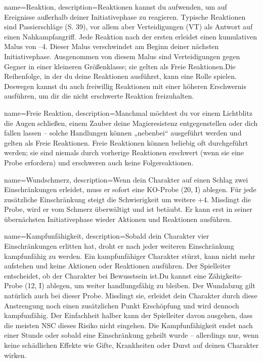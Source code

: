 {
    name={Reaktion},
    description={Reaktionen kannst du aufwenden, um auf Ereignisse außerhalb deiner Initiativephase zu reagieren. Typische Reaktionen sind Passierschläge (S. 39), vor allem aber Verteidigungen (VT) als Antwort auf einen Nahkampfangriff. Jede Reaktion nach der ersten erleidet einen kumulativen Malus von –4. Dieser Malus verschwindet am Beginn deiner nächsten Initiativephase. Ausgenommen von diesem Malus sind Verteidigungen gegen Gegner in einer kleineren Größenklasse; sie gelten als Freie Reaktionen.\newline     Die Reihenfolge, in der du deine Reaktionen ausführst, kann eine Rolle spielen. Deswegen kannst du auch freiwillig Reaktionen mit einer höheren Erschwernis ausführen, um dir die nicht erschwerte Reaktion freizuhalten.}
}


{
    name={Freie Reaktion},
    description={Manchmal möchtest du vor einem Lichtblitz die Augen schließen, einem Zauber deine Magieresistenz entgegenstellen oder dich fallen lassen – solche Handlungen können „nebenbei“ ausgeführt werden und gelten als Freie Reaktionen. Freie Reaktionen können beliebig oft durchgeführt werden; sie sind niemals durch vorherige Reaktionen erschwert (wenn sie eine Probe erfordern) und erschweren auch keine Folgereaktionen.}
}


{
    name={Wundschmerz},
    description={Wenn dein Charakter auf einen Schlag zwei Einschränkungen erleidet, muss er sofort eine KO-Probe (20, I) ablegen. Für jede zusätzliche Einschränkung steigt die Schwierigkeit um weitere +4. Misslingt die Probe, wird er vom Schmerz überwältigt und ist betäubt. Er kann erst in seiner übernächsten Initiativephase wieder Aktionen und Reaktionen ausführen.}
}


{
    name={Kampfunfähigkeit},
    description={Sobald dein Charakter vier Einschränkungen erlitten hat, droht er nach jeder weiteren Einschränkung kampfunfähig zu werden. Ein kampfunfähiger Charakter stürzt, kann nicht mehr aufstehen und keine Aktionen oder Reaktionen ausführen. Der Spielleiter entscheidet, ob der Charakter bei Bewusstsein ist.\newline     Du kannst eine Zähigkeits-Probe (12, I) ablegen, um weiter handlungsfähig zu bleiben. Der Wundabzug gilt natürlich auch bei dieser Probe. Misslingt sie, erleidet dein Charakter durch diese Anstrengung noch einen zusätzlichen Punkt Erschöpfung und wird dennoch kampfunfähig. Der Einfachheit halber kann der Spielleiter davon ausgehen, dass die meisten NSC dieses Risiko nicht eingehen. Die Kampfunfähigkeit endet nach einer Stunde oder sobald eine Einschränkung geheilt wurde – allerdings nur, wenn keine schädlichen Effekte wie Gifte, Krankheiten oder Durst auf deinen Charakter wirken.}
}


